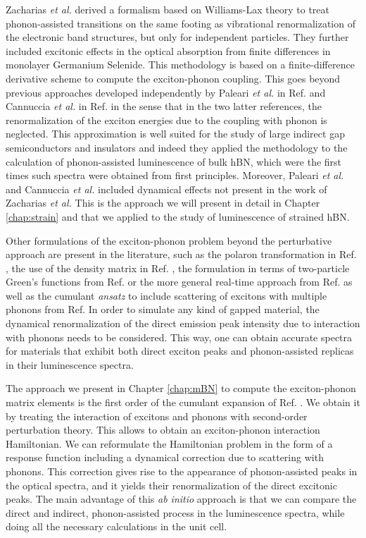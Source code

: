 Zacharias \textit{et al.} derived a formalism based on Williams-Lax theory\cite{williams1951theoretical,lax1952franck} to treat phonon-assisted transitions on the same footing as vibrational renormalization of the electronic band structures, but only for independent particles.\cite{zacharias2016one} They further included excitonic effects in the optical absorption from finite differences \cite{huang2021exciton} in monolayer Germanium Selenide. This methodology is based on a finite-difference derivative scheme to compute the exciton-phonon coupling. This goes beyond previous approaches developed independently by Paleari \textit{et al.} in Ref. \cite{paleari2019exciton} and Cannuccia \textit{et al.} in Ref. \cite{cannuccia2019theory} in the sense that in the two latter references, the renormalization of the exciton energies due to the coupling with phonon is neglected. This approximation is well suited for the study of large indirect gap semiconductors and insulators and indeed they applied the methodology to the calculation of phonon-assisted luminescence of bulk hBN, which were the first times such spectra were obtained from first principles. Moreover, Paleari \textit{et al.} and Cannuccia \textit{et al.} included dynamical effects not present in the work of Zacharias \textit{et al.} This is the approach we will present in detail in Chapter \ref{chap:strain} and that we applied to the study of luminescence of strained hBN. 

Other formulations of the exciton-phonon problem beyond the perturbative approach are present in the literature, such as the polaron transformation in Ref. \cite{feldtmann2009phonon}, the use of the density matrix in Ref. \cite{brem2020phonon}, the formulation in terms of two-particle Green's functions from Ref. \cite{antonius2017theory} or the more general real-time approach from Ref. \cite{paleari2022exciton} as well as the cumulant \textit{ansatz} to include scattering of excitons with multiple phonons from Ref. \cite{cudazzo2020first} In order to simulate any kind of gapped material, the dynamical renormalization of the direct emission peak intensity due to interaction with phonons needs to be considered. This way, one can obtain accurate spectra for materials that exhibit both direct exciton peaks and phonon-assisted replicas in their luminescence spectra.

The approach we present in Chapter \ref{chap:mBN} to compute the exciton-phonon matrix elements is the first order of the cumulant expansion of Ref. \cite{cudazzo2020first}. We obtain it by treating the interaction of excitons and phonons with second-order perturbation theory. This allows to obtain an exciton-phonon interaction Hamiltonian. We can reformulate the Hamiltonian problem in the form of a response function including a dynamical correction due to scattering with phonons. This correction gives rise to the appearance of phonon-assisted peaks in the optical spectra, and it yields their renormalization of the direct excitonic peaks. The main advantage of this \textit{ab initio} approach is that we can compare the direct and indirect, phonon-assisted process in the luminescence spectra, while doing all the necessary calculations in the unit cell.


